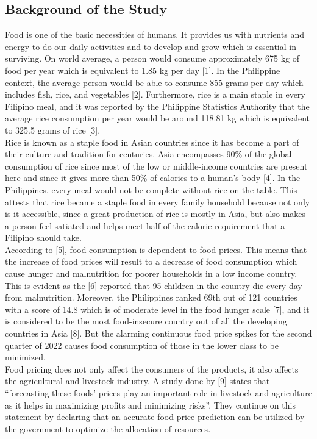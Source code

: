 \documentclass[runningheads]{llncs}
\begin{document}
\subsection{Background of the Study}

Food is one of the basic necessities of humans. It provides us with nutrients and energy to do our daily activities and to develop and grow which is essential in surviving. On world average, a person would consume approximately 675 kg of food per year which is equivalent to 1.85 kg per day [1]. In the Philippine context, the average person would be able to consume 855 grams per day which includes fish, rice, and vegetables [2]. Furthermore, rice is a main staple in every Filipino meal, and it was reported by the Philippine Statistics Authority that the average rice consumption per year would be around 118.81 kg which is equivalent to 325.5 grams of rice [3].\\

Rice is known as a staple food in Asian countries since it has become a part of their culture and tradition for centuries. Asia encompasses 90\% of the global consumption of rice since most of the low or middle-income countries are present here and since it gives more than 50\% of calories to a human’s body [4]. In the Philippines, every meal would not be complete without rice on the table. This attests that rice became a staple food in every family household because not only is it accessible, since a great production of rice is mostly in Asia, but also makes a person feel satiated and helps meet half of the calorie requirement that a Filipino should take.\\

According to [5], food consumption is dependent to food prices. This means that the increase of food prices will result to a decrease of food consumption which cause hunger and malnutrition for poorer households in a low income country. This is evident as the [6] reported that 95 children in the country die every day from malnutrition. Moreover, the Philippines ranked 69th out of 121 countries with a score of 14.8 which is of moderate level in the food hunger scale [7], and it is considered to be the most food-insecure country out of all the developing countries in Asia [8]. But the alarming continuous food price spikes for the second quarter of 2022 causes food consumption of those in the lower class to be minimized. 
\\

Food pricing does not only affect the consumers of the products, it also affects the agricultural and livestock industry. A study done by [9] states that “forecasting these foods’ prices play an important role in livestock and agriculture as it helps in maximizing profits and minimizing risks”. They continue on this statement by declaring that an accurate food price prediction can be utilized by the government to optimize the allocation of resources.\\
\end{document}

